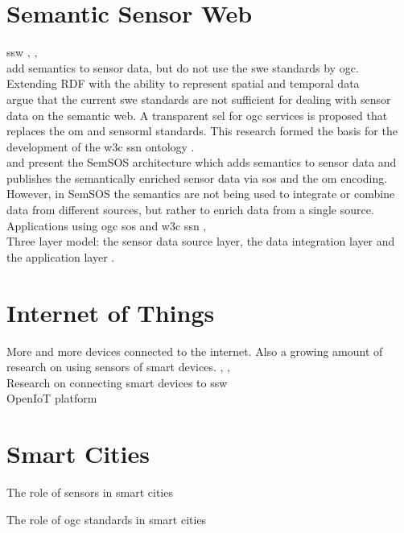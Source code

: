 \section{Semantic Sensor Web}

\ac{ssw} \citep{SSW:Sheth}, \citep{SSW:deMel}, \citep{SSW:Bakillah} \\ 

\cite{SSW:Huang} add semantics to sensor data, but do not use the \ac{swe} standards by \ac{ogc}. \\ 

Extending RDF with the ability to represent spatial and temporal data \citep{SSW:Koubarakis} \\ 

\cite{SSW:Janowicz2} argue that the current \ac{swe} standards are not sufficient for dealing with sensor data on the semantic web. A transparent \ac{sel} for \ac{ogc} services is proposed that replaces the \ac{om} and \ac{sensorml} standards. This research formed the basis for the development of the \ac{w3c} \ac{ssn} ontology \citep{SSW:SSN_incubatorGroup}. \\ 

\cite{SSW:Henson} and \cite{SSW:Pschorr} present the SemSOS architecture which adds semantics to sensor data and publishes the semantically enriched sensor data via \ac{sos} and the \ac{om} encoding. However, in SemSOS the semantics are not being used to integrate or combine data from different sources, but rather to enrich data from a single source. \\ 

Applications using \ac{ogc} \ac{sos} and \ac{w3c} \ac{ssn} \citep{SSW:Kessler}, \citep{SSW:Barnaghi} \\

Three layer model: the sensor data source layer, the data integration layer and the application layer \cite{SSW:Wang}.

\section{Internet of Things}

More and more devices connected to the internet. Also a growing amount of research on using sensors of smart devices. \citep{IOT:Waher}, \citep{IOT:Zarko}, \citep{SSW:Calbimonte} \\

Research on connecting smart devices to \ac{ssw} \citep{SSW:Vera}  \\

OpenIoT platform \citep{IOT:Calbimonte}


\section{Smart Cities} 

The role of sensors in smart cities \citep{IOT:Zanelli}

The role of \ac{ogc} standards in smart cities \citep{SC:OGC}
\fi
